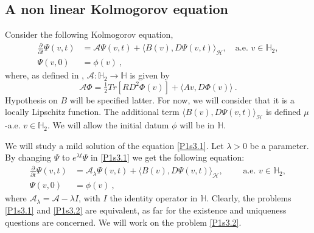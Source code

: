 \documentclass[]{interact}
\theoremstyle{plain}%
\theoremstyle{definition}
\theoremstyle{remark}
\begin{document}
\subsection{A non linear Kolmogorov equation}
    Consider the following \sloppy Kolmogorov equation,
%
    \begin{equation}
        \label{P1s3.1}
        \begin{aligned}
            \frac{\partial}{\partial t}
                \Psi(v,t)
                &=
                   \mathcal{A}\Psi(v,t)
                    +
                    \langle
                        B(v),D\Psi(v,t)
                    \rangle_\mathcal{H},
                    \quad \text{a.e. }
                    v\in\mathbb{H}_2,
            \\
            \Psi(v,0)
                &=
                    \phi(v)\nonumber \ ,
        \end{aligned}
    \end{equation}
%
    where, as defined in ,
    $\mathcal{A}:\mathbb{H}_2 \to \mathbb{H}$ is given by
%
    \begin{equation}\label{def-A}
        \mathcal{A} \Phi =
            \tfrac{1}{2} Tr[RD^2 \Phi(v)]
            +
            \langle
                A v, D\Phi(v)
            \rangle \ .
     \end{equation}
        Hypothesis on $B$ will be specified latter. For now, we will consider 
    that it is a locally Lipschitz function. The additional term
    $ \langle B(v),D\Psi(v,t) \rangle_\mathcal{H}$ is defined $\mu$-a.e.
    $v\in\mathbb{H}_2$. We will allow the initial datum $\phi$ will be
    in $\mathbb{H}$.

        We will study a mild solution of the equation \eqref{P1s3.1}. Let 
    $\lambda>0$ be a parameter. By changing $\Psi$ to $e^{\lambda t}\Psi$ in
    \eqref{P1s3.1} we get the following equation:
    \begin{equation}
    \label{P1s3.2}
        \begin{aligned}
            \frac{\partial}{\partial t}\Psi(v,t)
                &= \mathcal{A}_\lambda\Psi(v,t)
                +
                \langle
                    B(v),D\Psi(v,t)
                \rangle_\mathcal{H},
                \qquad \text{ a.e. }
                v \in \mathbb{H}_2,
            \\
            \Psi(v,0)
                &= \phi(v) \ ,
        \end{aligned}
    \end{equation}
    where $\mathcal{A}_\lambda=\mathcal{A}-\lambda I$, with $I$ the identity
    operator in $\mathbb{H}$. Clearly, the problems \eqref{P1s3.1} and
    \eqref{P1s3.2} are equivalent, as far for the existence and uniqueness
    questions are concerned. We will work on the problem \eqref{P1s3.2}.
\end{document}
